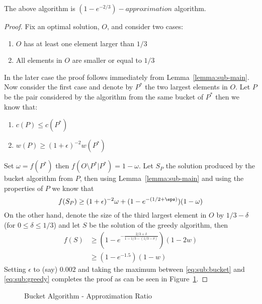 \begin{theorem}
The above algorithm is $(1 - e^{-2/3})-approximation$ algorithm.
\end{theorem}

\begin{proof}
Fix an optimal solution, $O$, and consider two cases:
\begin{enumerate}
  \item $O$ has at least one element larger than $1/3$
  \item All elements in $O$ are smaller or equal to $1/3$
\end{enumerate}
In the later case the proof follows immediately from Lemma~\ref{lemma:sub-main}.
Now consider the first case and denote by $P^*$ the two largest elements in $O$.
Let $P$ be the pair considered by the algorithm from the same bucket of $P^*$ then we know
that:
\begin{enumerate}
  \item $c(P) \leq c(P^*)$
  \item $w(P) \geq (1 + \epsilon)^{-2}w(P^*)$
\end{enumerate}
Set $\omega = f(P^*)$ then $f(O\setminus P^* | P^*) = 1 - \omega$.
Let $S_P$ the solution produced by the bucket algorithm from $P$, 
then using Lemma~\ref{lemma:sub-main} and using the properties of $P$ we know that
\begin{equation}
\label{eq:sub:bucket}
f(S_P) \geq (1 + \epsilon)^{-2}\omega + (1-e^{-(1/2 + \eps)})(1 - \omega)
\end{equation}
On the other hand, denote the size of the third largest element in $O$ by $1/3 - \delta$
(for $0 \leq \delta \leq 1/3$) and  let $S$ be the solution of the greedy algorithm, then 
\begin{align}
\label{eq:sub:greedy}
f(S) & \geq (1 - e^{-\frac{2/3 + \delta}{1 - 1/3 - (1/3 - \delta)}})(1 - 2w) 
\\
& \geq (1 - e^{-1.5})(1-w)
\end{align}
Setting $\epsilon$ to (say) $0.002$ and taking the maximum between \ref{eq:sub:bucket} and
\ref{eq:sub:greedy} completes the proof as can be seen in Figure~\ref{fig:sub:bucket}.
\end{proof}

\begin{figure}
\def\zeta{0.002}
\caption{
\label{fig:sub:bucket}
Bucket Algorithm - Approximation Ratio
}
\end{figure}
